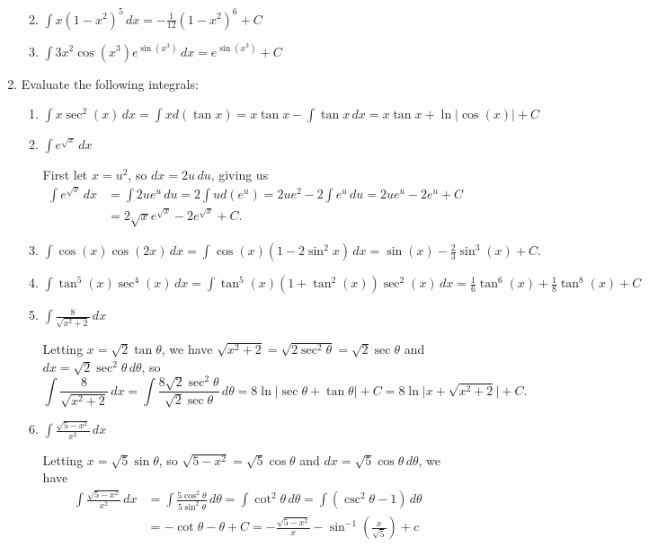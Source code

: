 \documentclass[12pt]{article}
\newcommand{\di}{\displaystyle}
\newcommand{\abs}[1]{\lvert #1\rvert}
\begin{document}
\begin{enumerate}
\begin{enumerate}
\bigskip

 \item $\di \int x(1-x^2)^5\,dx = -\frac{1}{12}(1-x^2)^6+C$

\bigskip

 \item $\di \int 3x^2\cos(x^3)e^{\sin(x^3)}\,dx = e^{\sin(x^3)}+C$
\end{enumerate}

\newpage

\item Evaluate the following integrals:
\begin{enumerate}
 \item $\di \int x\sec^2(x)\,dx = \int x d(\tan x) = x\tan x-\int \tan x\,dx = x\tan x+\ln\abs{\cos(x)}+C$


 \item $\di \int e^{\sqrt{x}}\,dx$

\medskip

First let $x=u^2$, so $dx=2u\,du$, giving us
\begin{align*}
 \int e^{\sqrt{x}}\,dx &= \int 2ue^u\,du = 2\int u d(e^u) = 2ue^2-2\int e^u\,du = 2ue^u-2e^u+C\\
& = 2\sqrt{x}e^{\sqrt{x}}-2e^{\sqrt{x}}+C.
\end{align*}



 \item $\di \int \cos(x)\cos(2x)\,dx = \int \cos(x)(1-2\sin^2x)\,dx = \sin(x)-\frac{2}{3}\sin^3(x)+C.$


 \item $\di \int \tan^5(x)\sec^4(x)\,dx = \int \tan^5(x)(1+\tan^2(x))\sec^2(x)\,dx = \frac{1}{6}\tan^6(x)+\frac{1}{8}\tan^8(x)+C$



 \item $\di \int \frac{8}{\sqrt{x^2+2}}\,dx$

\medskip

Letting $x=\sqrt{2}\tan\theta$, we have $\sqrt{x^2+2} = \sqrt{2\sec^2\theta} = \sqrt{2}\sec\theta$ and $dx = \sqrt{2}\sec^2\theta\,d\theta$, so
\[
 \int\frac{8}{\sqrt{x^2+2}}\,dx = \int \frac{8\sqrt{2}\sec^2\theta}{\sqrt{2}\sec\theta}\,d\theta = 8\ln\abs{\sec\theta+\tan\theta}+C = 8\ln\abs{x+\sqrt{x^2+2}}+C.
\]



 \item $\di \int \frac{\sqrt{5-x^2}}{x^2}\,dx$

\medskip

Letting $x=\sqrt{5}\sin\theta$, so $\sqrt{5-x^2} = \sqrt{5}\cos\theta$ and $dx = \sqrt{5}\cos\theta\,d\theta$, we have
\begin{align*}
 \int\frac{\sqrt{5-x^2}}{x^2}\,dx &= \int \frac{5\cos^2\theta}{5\sin^2\theta}\,d\theta = \int\cot^2\theta\,d\theta = \int (\csc^2\theta-1)\,d\theta\\
 & = -\cot\theta-\theta+C = -\frac{\sqrt{5-x^2}}{x}-\sin^{-1}\left(\frac{x}{\sqrt{5}}\right)+c
\end{align*}



\end{enumerate}
\end{enumerate}
\end{document}
